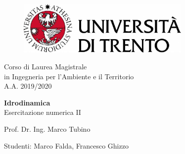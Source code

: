 \documentclass[12pt]{article} %
\begin{document}
	

\thispagestyle{empty} %
{\linespread{2.3}\selectfont
{\sffamily
	\begin{figure}
		\centering
		\includegraphics[width=0.75\textwidth]{logounitrento2019.jpg}
	\end{figure}
		
	\vspace*{-1.5em}
		
	\begin{center}
		{\Large Corso di Laurea Magistrale}\\
		\vspace*{-0.8em}
		{\Large in Ingegneria per l'Ambiente e il Territorio}\\
		\vspace*{0.5em}
		{\Large A.A. 2019/2020}
				
		\vspace*{4em}
		
		{\Huge \textbf{Idrodinamica}}\\{\Large Esercitazione numerica II}
		
		\vspace*{4em}
		
		{\Large Prof. Dr. Ing. Marco Tubino}
	\end{center}
	
	\vspace*{3.2em}
	
	\begin{center}
	{\large
		Studenti:
	}
	{\large
		Marco Falda, Francesco Ghizzo
	}
	\end{center}

}
}
\restoregeometry
\newpage
\thispagestyle{empty}
\tableofcontents
\newpage
\listoffigures
\newpage
\end{document}
